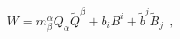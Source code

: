 \begin{equation}
  W = m^{\alpha}_{\beta} Q_{\alpha} \tilde{Q}^{{\beta}}
  + b_i B^i + \tilde{b}^{{j}} \tilde{B}_{{j}}~~,
\end{equation}


